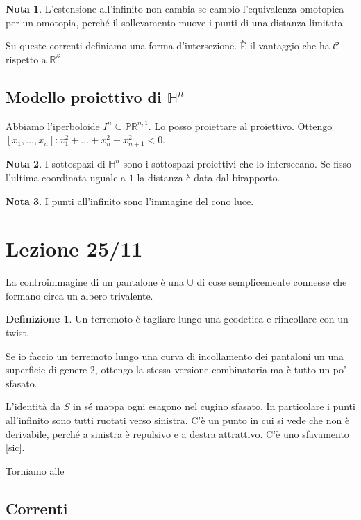 \documentclass[a4paper]{article}
\theoremstyle{definition}
\newtheorem{definition}{Definizione}
\newtheorem{remark}{Nota}
\begin{document}
    \begin{remark}
        L'estensione all'infinito non cambia se cambio l'equivalenza omotopica per un omotopia, perché il sollevamento muove i punti di una distanza limitata.
    \end{remark}
    
    Su queste correnti definiamo una forma d'intersezione. È il vantaggio che ha $\mathcal C$ rispetto a $\mathbb R^{\mathcal S}$.

\subsection{Modello proiettivo di $\mathbb H^n$}

    Abbiamo l'iperboloide $I^{n} \subseteq \mathbb{PR}^{n,1}$. Lo posso proiettare al proiettivo. Ottengo $[x_1, \ldots, x_n] : x_1^2 + \ldots + x_n^2 - x_{n+1}^2 < 0$.
    \begin{remark}
        I sottospazi di $\mathbb H^n$ sono i sottospazi proiettivi che lo intersecano. Se fisso l'ultima coordinata uguale a $1$ la distanza è data dal birapporto.
    \end{remark}

    \begin{remark}
        I punti all'infinito sono l'immagine del cono luce.
    \end{remark}

\section{Lezione 25/11}

La controimmagine di un pantalone è una $\cup$ di cose semplicemente connesse che formano circa un albero trivalente.

\begin{definition}
    Un terremoto è tagliare lungo una geodetica e riincollare con un twist.
\end{definition}

Se io faccio un terremoto lungo una curva di incollamento dei pantaloni un una superficie di genere 2, ottengo la stessa versione combinatoria ma è tutto un po' sfasato.

L'identità da $S$ in sé mappa ogni esagono nel cugino sfasato. In particolare i punti all'infinito sono tutti ruotati verso sinistra. C'è un punto in cui si vede che non è derivabile, perché a sinistra è repulsivo e a destra attrattivo. C'è uno sfavamento [sic].

Torniamo alle
\subsection{Correnti}
    
\end{document}
